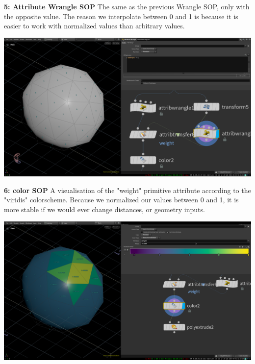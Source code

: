 \documentclass[11pt, a4paper]{article}
\begin{document}
\begin{minipage}[H]{0.4\textwidth}
	\textbf{5: Attribute Wrangle SOP}\newline 
The same as the previous Wrangle SOP, only with the opposite value. The reason
we interpolate between 0 and 1 is because it is easier to work with normalized
values than arbitrary values. 
	
\end{minipage}
\vspace{1pt}
\begin{minipage}[H]{0.6\textwidth}
	\includegraphics[width=1\textwidth]{media/houdini_fundamentals_5.png}
\end{minipage}


\begin{minipage}[H]{0.4\textwidth}
	\textbf{6: color SOP}\newline 
A visualisation of the "weight" primitive attribute according to the "viridis"
colorscheme. Because we normalized our values between 0 and 1, it is more stable
if we would ever change distances, or geometry inputs.
\end{minipage}
\vspace{1pt}
\begin{minipage}[H]{0.6\textwidth}
	\includegraphics[width=1\textwidth]{media/houdini_fundamentals_6.png}
\end{minipage}
\end{document}
